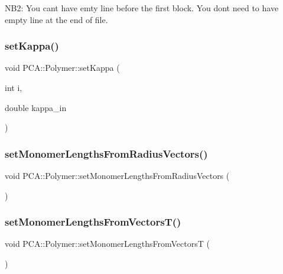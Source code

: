 N\+B2\+: You can\textquotesingle{}t have emty line before the first block. You don\textquotesingle{}t need to have empty line at the end of file. \hypertarget{class_p_c_a_1_1_polymer_ac8631ac2842b00802f24478b525c05db}{}\label{class_p_c_a_1_1_polymer_ac8631ac2842b00802f24478b525c05db} 
\subsubsection{\texorpdfstring{set\+Kappa()}{setKappa()}}
{\footnotesize\ttfamily void P\+C\+A\+::\+Polymer\+::set\+Kappa (\begin{DoxyParamCaption}\item[{int}]{i,  }\item[{double}]{kappa\+\_\+in }\end{DoxyParamCaption})\hspace{0.3cm}{\ttfamily [inline]}}

\hypertarget{class_p_c_a_1_1_polymer_a2dae638afa952c286c16122c7ab52b6e}{}\label{class_p_c_a_1_1_polymer_a2dae638afa952c286c16122c7ab52b6e} 
\subsubsection{\texorpdfstring{set\+Monomer\+Lengths\+From\+Radius\+Vectors()}{setMonomerLengthsFromRadiusVectors()}}
{\footnotesize\ttfamily void P\+C\+A\+::\+Polymer\+::set\+Monomer\+Lengths\+From\+Radius\+Vectors (\begin{DoxyParamCaption}{ }\end{DoxyParamCaption})}

\hypertarget{class_p_c_a_1_1_polymer_a217cddfa5b9e5bfe68f8e5d0802e2f31}{}\label{class_p_c_a_1_1_polymer_a217cddfa5b9e5bfe68f8e5d0802e2f31} 
\subsubsection{\texorpdfstring{set\+Monomer\+Lengths\+From\+Vectors\+T()}{setMonomerLengthsFromVectorsT()}}
{\footnotesize\ttfamily void P\+C\+A\+::\+Polymer\+::set\+Monomer\+Lengths\+From\+VectorsT (\begin{DoxyParamCaption}{ }\end{DoxyParamCaption})}

